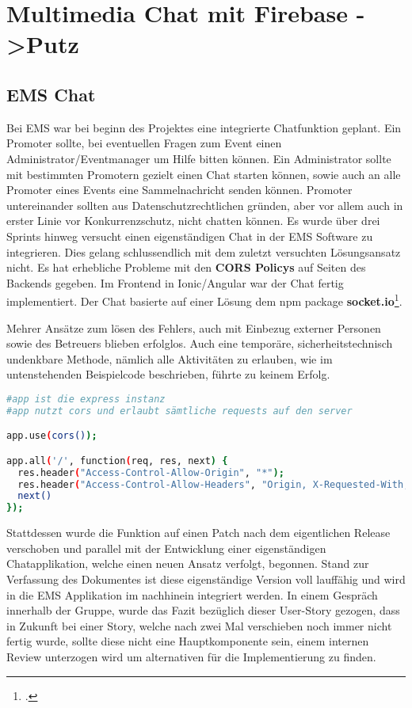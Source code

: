 \chapter{Multimedia Chat mit Firebase ->Putz}
\putz

\section{EMS Chat}
Bei EMS war bei beginn des Projektes eine integrierte Chatfunktion geplant. Ein Promoter sollte, bei eventuellen Fragen zum Event einen Administrator/Eventmanager um Hilfe bitten können. Ein Administrator sollte mit bestimmten
Promotern gezielt einen Chat starten können, sowie auch an alle Promoter eines Events eine Sammelnachricht senden können. Promoter untereinander sollten aus Datenschutzrechtlichen gründen, aber vor allem auch in erster
Linie vor Konkurrenzschutz, nicht chatten können.
Es wurde über drei Sprints hinweg versucht einen eigenständigen Chat in der EMS Software zu integrieren. Dies gelang schlussendlich mit dem zuletzt versuchten Lösungsansatz nicht.
Es hat erhebliche Probleme mit den \textbf{CORS Policys} auf Seiten des Backends gegeben. Im Frontend in Ionic/Angular war der Chat fertig implementiert. Der Chat basierte auf einer Lösung dem npm package \textbf{socket.io}\footcite{socket-io}.


Mehrer Ansätze zum lösen des Fehlers, auch mit Einbezug externer Personen sowie des Betreuers blieben erfolglos. Auch eine temporäre, sicherheitstechnisch undenkbare Methode, nämlich alle Aktivitäten zu erlauben, wie im untenstehenden Beispielcode beschrieben, führte zu keinem Erfolg.

\begin{lstlisting}[language=bash]
#app ist die express instanz
#app nutzt cors und erlaubt sämtliche requests auf den server 

app.use(cors());

app.all('/', function(req, res, next) {
  res.header("Access-Control-Allow-Origin", "*");
  res.header("Access-Control-Allow-Headers", "Origin, X-Requested-With, Content-Type, Accept");
  next()
});
\end{lstlisting}

Stattdessen wurde die Funktion auf einen Patch nach dem eigentlichen Release verschoben und parallel mit der Entwicklung einer eigenständigen Chatapplikation, welche einen neuen Ansatz verfolgt, begonnen. Stand zur Verfassung des Dokumentes ist diese eigenständige Version
voll lauffähig und wird in die EMS Applikation im nachhinein integriert werden. In einem Gespräch innerhalb der Gruppe, wurde das Fazit bezüglich dieser User-Story gezogen, dass in Zukunft bei einer Story, welche nach zwei Mal verschieben noch immer nicht
fertig wurde, sollte diese nicht eine Hauptkomponente sein, einem internen Review unterzogen wird um alternativen für die Implementierung zu finden.

